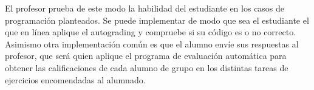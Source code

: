 El profesor prueba de este modo la habilidad del estudiante en los casos de programación planteados. Se puede implementar de modo que sea el estudiante el que en línea aplique el autograding y compruebe si su código es o no correcto. Asimismo otra implementación común es que el alumno envíe sus respuestas al profesor, que será quien aplique el programa de evaluación automática para obtener las calificaciones de cada alumno de grupo en los distintas tareas de ejercicios encomendadas al alumnado.

























